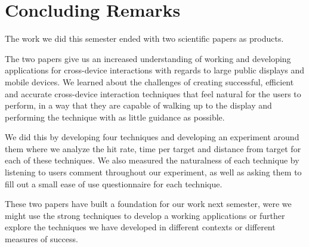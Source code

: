 \section*{Concluding Remarks}

The work we did this semester ended with two scientific papers as products. 

The two papers give us an increased understanding of working and developing applications for cross-device interactions with regards to large public displays and mobile devices.
We learned about the challenges of creating successful, efficient and accurate cross-device interaction techniques that feel natural for the users to perform, in a way that they are capable of walking up to the display and performing the technique with as little guidance as possible. 

We did this by developing four techniques and developing an experiment around them where we analyze the hit rate, time per target and distance from target for each of these techniques.
We also measured the naturalness of each technique by listening to users comment throughout our experiment, as well as asking them to fill out a small ease of use questionnaire for each technique. 


These two papers have built a foundation for our work next semester, were we might use the strong techniques to develop a working applications or further explore the techniques we have developed in different contexts or different measures of success. 